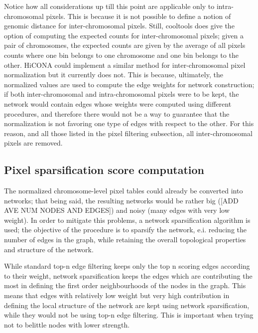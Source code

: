 Notice how all considerations up till this point are applicable only to intra-chromosomal pixels. This is because it is not possible to define a notion of genomic distance for inter-chromosomal pixels. Still, cooltools does give the option of computing the expected counts for inter-chromosomal pixels; given a pair of chromosomes, the expected counts are given by the average of all pixels counts where one bin belongs to one chromosome and one bin belongs to the other. HiCONA could implement a similar method for inter-chromosomal pixel normalization but it currently does not. This is because, ultimately, the normalized values are used to compute the edge weights for network construction; if both inter-chromosomal and intra-chromosomal pixels were to be kept, the network would contain edges whose weights were computed using different procedures, and therefore there would not be a way to guarantee that the normalization is not favoring one type of edges with respect to the other. For this reason, and all those listed in the pixel filtering subsection, all inter-chromosomal pixels are removed.

\subsection{Pixel sparsification score computation}

The normalized chromosome-level pixel tables could already be converted into networks; that being said, the resulting networks would be rather big ([ADD AVE NUM NODES AND EDGES]) and noisy (many edges with very low weight). In order to mitigate this problems, a network sparsification algorithm \cite{sparsification2009} is used; the objective of the procedure is to sparsify the network, e.i. reducing the number of edges in the graph, while retaining the overall topological properties and structure of the network.

While standard top-n edge filtering keeps only the top n scoring edges according to their weight, network sparsification keeps the edges which are contributing the most in defining the first order neighbourhoods of the nodes in the graph. This means that edges with relatively low weight but very high contribution in defining the local structure of the network are kept using network sparsification, while they would not be using top-n edge filtering. This is important when trying not to belittle nodes with lower strength.

